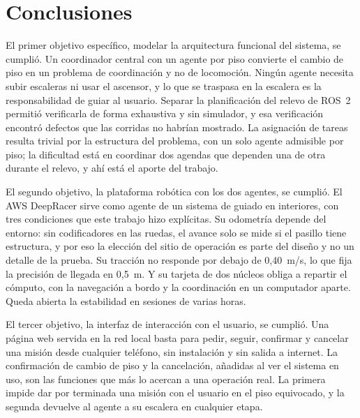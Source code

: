 %
\chapter*{Conclusiones}

El primer objetivo específico, modelar la arquitectura funcional del sistema, se
cumplió. Un coordinador central con un agente por piso convierte el cambio de piso en un problema de coordinación y no de locomoción. Ningún agente necesita
subir escaleras ni usar el ascensor, y lo que se traspasa en la escalera es la
responsabilidad de guiar al usuario. Separar la planificación del relevo de
ROS~2 permitió verificarla de forma exhaustiva y sin simulador, y esa
verificación encontró defectos que las corridas no habrían mostrado. La
asignación de tareas resulta trivial por la estructura del problema, con un solo
agente admisible por piso; la dificultad está en coordinar dos agendas que
dependen una de otra durante el relevo, y ahí está el aporte del trabajo.

El segundo objetivo, la plataforma robótica con los dos agentes, se cumplió. El
AWS DeepRacer sirve como agente de un sistema de guiado en interiores, con tres
condiciones que este trabajo hizo explícitas. Su odometría depende del entorno:
sin codificadores en las ruedas, el avance solo se mide si el pasillo tiene
estructura, y por eso la elección del sitio de operación es parte del diseño y
no un detalle de la prueba. Su tracción no responde por debajo de 0,40~m/s, lo
que fija la precisión de llegada en 0,5~m. Y su tarjeta de dos núcleos obliga a
repartir el cómputo, con la navegación a bordo y la coordinación en un
computador aparte. Queda abierta la estabilidad en sesiones de varias horas.

El tercer objetivo, la interfaz de interacción con el usuario, se cumplió. Una
página web servida en la red local basta para pedir, seguir, confirmar y
cancelar una misión desde cualquier teléfono, sin instalación y sin salida a
internet. La confirmación de cambio de piso y la cancelación, añadidas al ver el
sistema en uso, son las funciones que más lo acercan a una operación real. La primera impide dar por terminada una misión con el usuario en el piso
equivocado, y la segunda devuelve al agente a su escalera en cualquier etapa.

